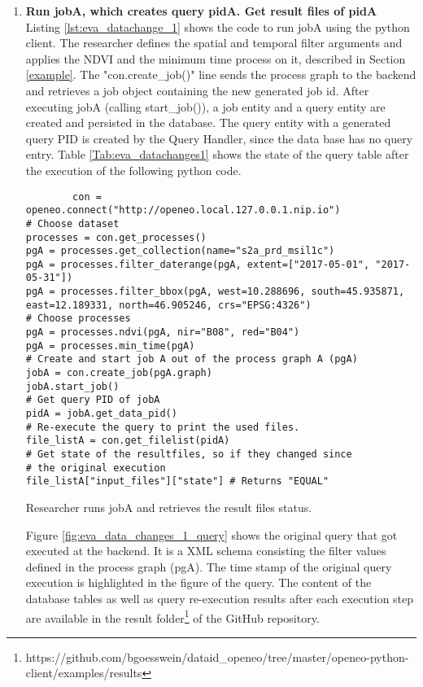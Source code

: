 \documentclass[draft,final]{vutinfth} %
\newenvironment{code}{\captionsetup{type=listing}}{}
\begin{document}
\begin{enumerate}
	\item \textbf{Run jobA, which creates query pidA. Get result files of pidA} \\
	Listing \ref{lst:eva_datachange_1} shows the code to run jobA using the python client. The researcher defines the spatial and temporal filter arguments and applies the NDVI and the minimum time process on it, described in Section \ref{example}. The "con.create\_job()" line sends the process graph to the backend and retrieves a job object containing the new generated job id. After executing jobA (calling start\_job()), a job entity and a query entity are created and persisted in the database. The query entity with a generated query PID is created by the Query Handler, since the data base has no query entry. Table \ref{Tab:eva_datachanges1} shows the state of the query table after the execution of the following python code.
	\begin{code}
		\begin{verbatim}
		con = openeo.connect("http://openeo.local.127.0.0.1.nip.io")
# Choose dataset
processes = con.get_processes()
pgA = processes.get_collection(name="s2a_prd_msil1c")
pgA = processes.filter_daterange(pgA, extent=["2017-05-01", "2017-05-31"])
pgA = processes.filter_bbox(pgA, west=10.288696, south=45.935871, 
east=12.189331, north=46.905246, crs="EPSG:4326")
# Choose processes
pgA = processes.ndvi(pgA, nir="B08", red="B04")
pgA = processes.min_time(pgA)
# Create and start job A out of the process graph A (pgA)
jobA = con.create_job(pgA.graph)
jobA.start_job()
# Get query PID of jobA
pidA = jobA.get_data_pid()
# Re-execute the query to print the used files.
file_listA = con.get_filelist(pidA)
# Get state of the resultfiles, so if they changed since 
# the original execution 
file_listA["input_files"]["state"] # Returns "EQUAL"
		\end{verbatim}
		\caption{Researcher runs jobA and retrieves the result files status.}
		\label{lst:eva_datachange_1}
	\end{code}
	Figure \ref{fig:eva_data_changes_1_query} shows the original query that got executed at the backend. It is a XML schema consisting the filter values defined in the process graph (pgA). The time stamp of the original query execution is highlighted in the figure of the query. The content of the database tables as well as query re-execution results after each execution step are available in the result folder\footnote{https://github.com/bgoesswein/dataid\_openeo/tree/master/openeo-python-client/examples/results} of the GitHub repository. 
	

\end{enumerate}
\end{document}
